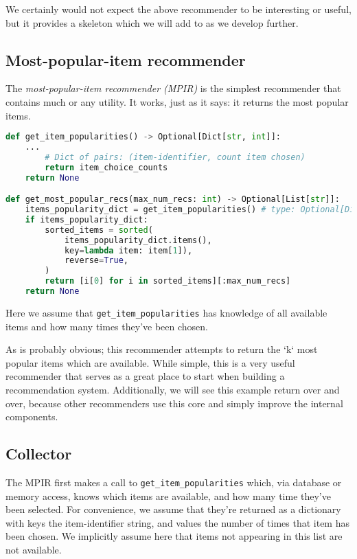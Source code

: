 We certainly would not expect the above recommender to be interesting or useful, but it provides a skeleton which we will add to as we develop further.

\subsection{Most-popular-item recommender}

The \emph{most-popular-item recommender (MPIR)} is the simplest recommender that contains much or any utility. It works, just as it says: it returns the most popular items.

\begin{lstlisting}[language=Python]
def get_item_popularities() -> Optional[Dict[str, int]]:
	...
	    # Dict of pairs: (item-identifier, count item chosen)
        return item_choice_counts 
    return None

def get_most_popular_recs(max_num_recs: int) -> Optional[List[str]]:
	items_popularity_dict = get_item_popularities() # type: Optional[Dict[str, int]]
	if items_popularity_dict:
		sorted_items = sorted(
			items_popularity_dict.items(), 
			key=lambda item: item[1]),
			reverse=True,
		)
		return [i[0] for i in sorted_items][:max_num_recs]
    return None
\end{lstlisting}


Here we assume that \lstinline{get_item_popularities} has knowledge of all available items and how many times they've been chosen.

As is probably obvious; this recommender attempts to return the `k` most popular items which are available. While simple, this is a very useful recommender that serves as a great place to start when building a recommendation system. Additionally, we will see this example return over and over, because other recommenders use this core and simply improve the internal components.

\subsection{Collector}

The MPIR first makes a call to \lstinline{get_item_popularities} which, via database or memory access, knows which items are available, and how many time they've been selected. For convenience, we assume that they're returned as a dictionary with keys the item-identifier string, and values the number of times that item has been chosen. We implicitly assume here that items not appearing in this list are not available.

